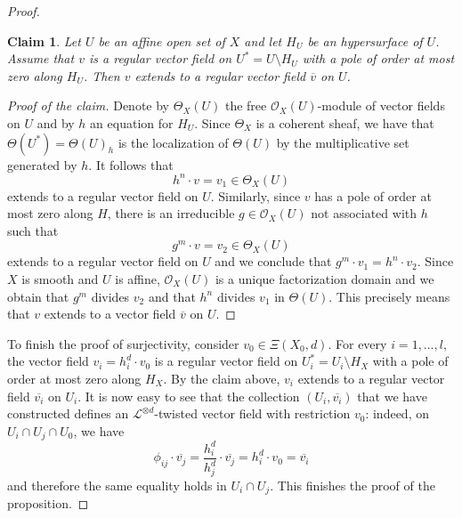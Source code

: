 \documentclass[12pt]{amsart}
\theoremstyle{definition}
\theoremstyle{plain}
\newtheorem*{claimproof}{Claim}
\theoremstyle{exampstyle}
\theoremstyle{exampstyle}\newtheorem{thmxbis}{Theorem}
\numberwithin{equation}{section}
\theoremstyle{remark}
\begin{document}
\begin{proof}
\begin{claimproof} 
Let $U$ be an affine open set of $X$ and let $H_U$ be an hypersurface of $U$. Assume that $v$ is a regular vector field on $U^\ast = U \setminus H_U$ with a pole of order at most zero along $H_U$. Then $v$ extends to a regular vector field $\overline{v}$ on $U$. 
\end{claimproof}

\begin{proof}[Proof of the claim] 
Denote by $\Theta_X(U)$ the free $\mathcal O_X(U)$-module of vector fields on $U$ and by $h$ an equation for $H_U$. Since $\Theta_X$ is a coherent sheaf, we have that $\Theta(U^\ast) = \Theta(U)_h$
is the localization of $\Theta(U)$ by the multiplicative set generated by $h$. It follows that 
$$h^n \cdot v  = v_1 \in \Theta_X(U)$$ 
extends to a regular vector field on $U$. Similarly, since $v$ has a pole of order at most zero along $H$, there is an irreducible $g \in \mathcal O_X(U)$  not associated with $h$ such that 
$$ g^m \cdot v = v_2 \in \Theta_X(U)$$
extends to a regular vector field on $U$ and we conclude that
$g^m\cdot v_1 = h^n \cdot v_2$.
Since  $X$ is smooth and $U$ is affine, $\mathcal O_X(U)$ is a unique factorization domain and we obtain that $g^m$ divides $v_2$ and that $h^n$ divides $v_1$ in $\Theta(U)$. This precisely means that $v$ extends to a vector field $\overline{v}$ on $U$. 
\end{proof} 
To finish the proof of surjectivity, consider $v_0 \in \Xi(X_0,d)$. 
For every $i = 1,\ldots, l$, the vector field $v_i = h_i^d \cdot v_0$ is a regular vector field on $U_i^\ast = U_i \setminus H_X$ with a pole of order at most zero along $H_X$. By the claim above, $v_i$ extends to a regular vector field $\overline{v_i}$ on $U_i$. It is now easy to see that the collection $(U_i, \overline{v_i})$ that we have constructed defines an $\mathcal L^{\otimes d}$-twisted vector field with restriction $v_0$: indeed, on $U_i \cap U_j \cap U_0$, we have
$$ \phi_{ij} \cdot \overline{v_j} = \frac{h_i^d}{h_j^d} \cdot \overline{v_j} =  h_i^d \cdot v_0 = \overline{v_i}$$  
and therefore the same equality holds in $U_i \cap U_j$. This finishes the proof of the proposition.
\end{proof}
\end{document}
